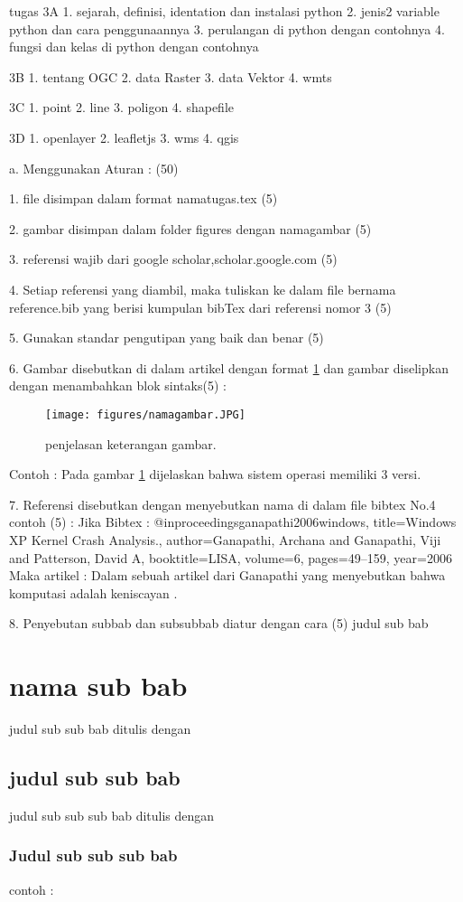 tugas
3A
1. sejarah, definisi, identation dan instalasi python
2. jenis2 variable python dan cara penggunaannya
3. perulangan di python dengan contohnya
4. fungsi dan kelas di python dengan contohnya


3B 
1. tentang OGC
2. data Raster
3. data Vektor
4. wmts

3C
1. point
2. line
3. poligon
4. shapefile

3D
1. openlayer
2. leafletjs
3. wms
4. qgis




a. Menggunakan Aturan : (50)

		1. file disimpan dalam format namatugas.tex (5)

		2. gambar disimpan dalam folder figures dengan namagambar (5)

		3. referensi wajib dari google scholar,scholar.google.com (5)

		4. Setiap referensi yang diambil, maka tuliskan ke dalam 
			file bernama reference.bib
		   yang berisi kumpulan bibTex dari referensi nomor 3 (5)

		5. Gunakan standar pengutipan yang baik dan benar (5)

		6. Gambar disebutkan di dalam artikel dengan format \ref{namagambar}
		   dan gambar diselipkan dengan menambahkan blok sintaks(5) :
			\begin{figure}[ht]
			\centerline{\texttt{[image: figures/namagambar.JPG]}}
			\caption{penjelasan keterangan gambar.}
			\label{namagambar}
			\end{figure}
			Contoh :
			Pada gambar \ref{namagambar} dijelaskan bahwa sistem operasi memiliki 
			3 versi.
	
		7. Referensi disebutkan dengan menyebutkan nama di dalam file bibtex No.4
		   contoh (5) :
			Jika Bibtex :
			@inproceedings{ganapathi2006windows,
			  title={Windows XP Kernel Crash Analysis.},
			  author={Ganapathi, Archana and Ganapathi, Viji and Patterson, David A},
			  booktitle={LISA},
			  volume={6},
			  pages={49--159},
			  year={2006}
			}
			Maka artikel :
			Dalam sebuah artikel dari Ganapathi yang menyebutkan bahwa komputasi 
			adalah keniscayan \cite{ganapathi2006windows}.
	
	
		8. Penyebutan subbab dan subsubbab diatur dengan cara (5)
			judul sub bab \section{nama sub bab}
			judul sub sub bab ditulis dengan \subsection{judul sub sub bab}
			judul sub sub sub bab ditulis dengan \subsubsection{Judul sub sub sub bab}
			contoh :
